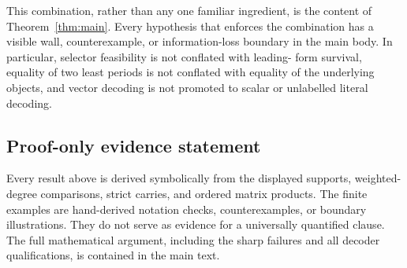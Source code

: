 \documentclass[11pt,letterpaper]{article}
\theoremstyle{definition}
\theoremstyle{remark}
\numberwithin{equation}{section}
\begin{document}
This combination, rather than any one familiar ingredient, is the content
of Theorem~\ref{thm:main}.  Every hypothesis that enforces the combination
has a visible wall, counterexample, or information-loss boundary in the main
body.  In particular, selector feasibility is not conflated with leading-
form survival, equality of two least periods is not conflated with equality
of the underlying objects, and vector decoding is not promoted to scalar or
unlabelled literal decoding.

\subsection{Proof-only evidence statement}

Every result above is derived symbolically from the displayed supports,
weighted-degree comparisons, strict carries, and ordered matrix products.
The finite examples are hand-derived notation checks, counterexamples, or
boundary illustrations.  They do not serve as evidence for a universally
quantified clause.  The full mathematical argument, including the sharp
failures and all decoder qualifications, is contained in the main text.

\clearpage


\end{document}
